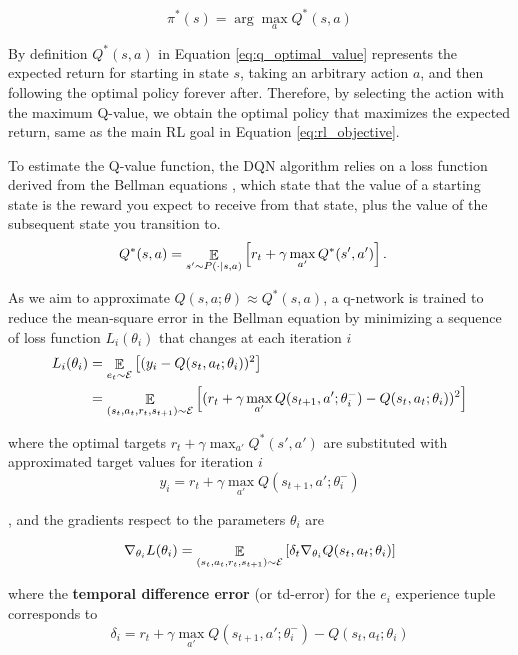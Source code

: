 \begin{equation}
    \pi^*(s) = \arg \max_a Q^* (s,a)
    \label{eq:optinal_q_policy}
\end{equation}

By definition $Q^*(s,a)$ in Equation \ref{eq:q_optimal_value} represents the expected return for starting in state $s$, taking an arbitrary action $a$, and then following the optimal policy forever after. Therefore, by selecting the action with the maximum Q-value, we obtain the optimal policy that maximizes the expected return, same as the main RL goal in Equation \ref{eq:rl_objective}.

To estimate the Q-value function, the DQN algorithm relies on a loss function derived from the Bellman equations \cite{sutton2018reinforcement}, which state that the value of a starting state is the reward you expect to receive from that state, plus the value of the subsequent state you transition to.
\begin{align*}
Q^*(s,a) &= \mathop{\mathbb{E}}\limits_{s'\sim P(\cdot | s,a)}\left[r_t + \gamma \max_{a'} Q^*(s',a')\right].
\end{align*}

As we aim to approximate $Q(s, a; \theta) \approx Q^*(s, a)$, a q-network is trained to reduce the mean-square error in the Bellman equation by minimizing a sequence of loss function $L_i(\theta_i)$ that changes at each iteration $i$
\begin{align*}
    L_i (\theta_i) & = \mathop{\mathbb{E}}\limits_{e_t \sim \mathcal{E}}\left[(y_i - Q(s_t, a_t; \theta_i))^2\right] \\
    & = \mathop{\mathbb{E}}\limits_{(s_t, a_t, r_t, s_{t+1}) \sim \mathcal{E}}\left[(r_t + \gamma \max_{a'} Q(s_{t+1}, a'; \theta^-_{i}) - Q(s_t, a_t; \theta_i))^2\right] 
\end{align*}

where the optimal targets $r_t + \gamma \max_{a'} Q^*(s',a')$ are substituted with approximated target values for iteration $i$
\begin{equation}
    y_i = r_t + \gamma \max_{a'} Q(s_{t+1}, a'; \theta^-_{i})
\end{equation}

, and the gradients respect to the parameters $\theta_i$ are

\begin{equation}
    \nabla_{\theta_i} L(\theta_i) = \mathop{\mathbb{E}}\limits_{(s_t, a_t, r_t, s_{t+1}) \sim \mathcal{E}}\left[ \delta_t \nabla_{\theta_i}Q(s_t, a_t; \theta_i)\right] 
\end{equation}

where the \textbf{temporal difference error} (or td-error) for the $e_i$ experience tuple corresponds to
\begin{equation}
    \delta_i = r_t + \gamma \max_{a'} Q(s_{t+1}, a'; \theta^-_{i}) - Q(s_t, a_t; \theta_i)
\end{equation}

